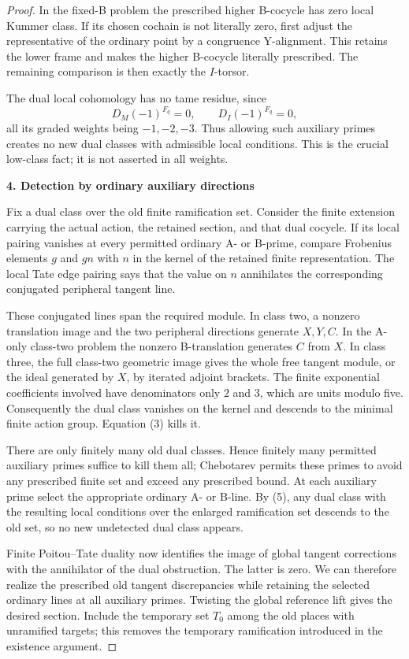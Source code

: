 \begin{proof}
In the fixed-B problem the prescribed higher B-cocycle has zero local Kummer class. If its chosen cochain is not literally zero, first adjust the representative of the ordinary point by a congruence Y-alignment. This retains the lower frame and makes the higher B-cocycle literally prescribed. The remaining comparison is then exactly the $I$-torsor.

The dual local cohomology has no tame residue, since
\[
 D_M(-1)^{F_q}=0,\qquad D_I(-1)^{F_q}=0,
 \tag{5}
\]
all its graded weights being $-1,-2,-3$. Thus allowing such auxiliary primes creates no new dual classes with admissible local conditions. This is the crucial low-class fact; it is not asserted in all weights.

\par\medskip\noindent\textbf{4. Detection by ordinary auxiliary directions}\par\nobreak\smallskip
Fix a dual class over the old finite ramification set. Consider the finite extension carrying the actual action, the retained section, and that dual cocycle. If its local pairing vanishes at every permitted ordinary A- or B-prime, compare Frobenius elements $g$ and $gn$ with $n$ in the kernel of the retained finite representation. The local Tate edge pairing says that the value on $n$ annihilates the corresponding conjugated peripheral tangent line.

These conjugated lines span the required module. In class two, a nonzero translation image and the two peripheral directions generate $X,Y,C$. In the A-only class-two problem the nonzero B-translation generates $C$ from $X$. In class three, the full class-two geometric image gives the whole free tangent module, or the ideal generated by $X$, by iterated adjoint brackets. The finite exponential coefficients involved have denominators only $2$ and $3$, which are units modulo five. Consequently the dual class vanishes on the kernel and descends to the minimal finite action group. Equation (3) kills it.

There are only finitely many old dual classes. Hence finitely many permitted auxiliary primes suffice to kill them all; Chebotarev permits these primes to avoid any prescribed finite set and exceed any prescribed bound. At each auxiliary prime select the appropriate ordinary A- or B-line. By (5), any dual class with the resulting local conditions over the enlarged ramification set descends to the old set, so no new undetected dual class appears.

Finite Poitou--Tate duality now identifies the image of global tangent corrections with the annihilator of the dual obstruction. The latter is zero. We can therefore realize the prescribed old tangent discrepancies while retaining the selected ordinary lines at all auxiliary primes. Twisting the global reference lift gives the desired section. Include the temporary set $T_0$ among the old places with unramified targets; this removes the temporary ramification introduced in the existence argument.


\end{proof}
